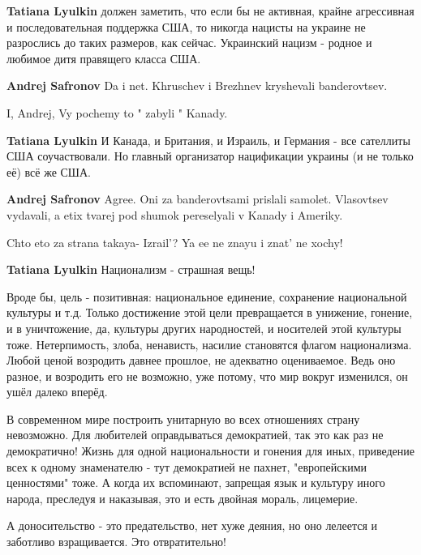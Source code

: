 \begin{itemize}
\begin{itemize}
\textbf{Tatiana Lyulkin} должен заметить, что если бы не активная, крайне агрессивная и последовательная поддержка США, то никогда нацисты на украине не разрослись до таких размеров, как сейчас. Украинский нацизм - родное и любимое дитя правящего класса США.

\textbf{Andrej Safronov} Da i net. Khruschev i Brezhnev kryshevali banderovtsev.

I, Andrej, Vy pochemy to " zabyli " Kanady.

\textbf{Tatiana Lyulkin} И Канада, и Британия, и Израиль, и Германия - все сателлиты США соучаствовали. Но главный организатор нацификации украины (и не только её) всё же США.

\textbf{Andrej Safronov} Agree. Oni za banderovtsami prislali samolet. Vlasovtsev vydavali, a etix tvarej pod shumok pereselyali v Kanady i Ameriky.


Chto eto za strana takaya- Izrail'? Ya ee ne znayu i znat' ne xochy!

\textbf{Tatiana Lyulkin}
Национализм - страшная вещь!

Вроде бы, цель - позитивная: национальное единение, сохранение национальной
культуры и т.д. Только достижение этой цели превращается в унижение, гонение, и
в уничтожение, да, культуры других народностей, и носителей этой культуры тоже.
Нетерпимость, злоба, ненависть, насилие становятся флагом национализма. Любой
ценой возродить давнее прошлое, не адекватно оцениваемое. Ведь оно разное, и
возродить его не возможно, уже потому, что мир вокруг изменился, он ушёл далеко
вперёд.

В современном мире построить унитарную во всех отношениях страну невозможно.
Для любителей оправдываться демократией, так это как раз не демократично! Жизнь
для одной национальности и гонения для иных, приведение всех к одному
знаменателю - тут демократией не пахнет, "европейскими ценностями" тоже. А
когда их вспоминают, запрещая язык и культуру иного народа, преследуя и
наказывая, это и есть двойная мораль, лицемерие.

А доносительство - это предательство, нет хуже деяния, но оно лелеется и
заботливо взращивается. Это отвратительно!

\end{itemize} %



\end{itemize}
